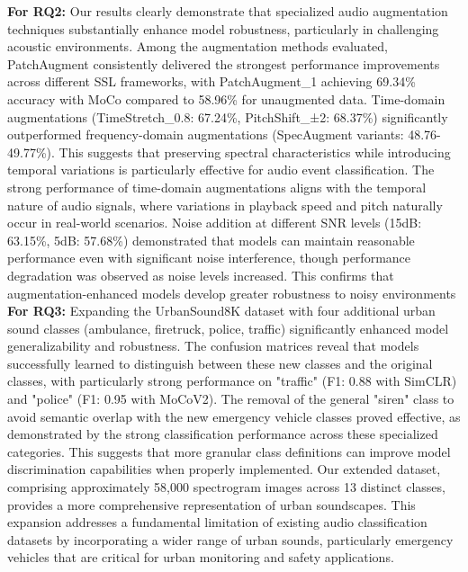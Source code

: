 \documentclass[11pt]{article}
\begin{document}
\textbf{For RQ2:} Our results clearly demonstrate that specialized audio augmentation techniques substantially enhance model robustness, particularly in challenging acoustic environments. Among the augmentation methods evaluated, PatchAugment consistently delivered the strongest performance improvements across different SSL frameworks, with PatchAugment\_1 achieving 69.34\% accuracy with MoCo compared to 58.96\% for unaugmented data. Time-domain augmentations (TimeStretch\_0.8: 67.24\%, PitchShift\_±2: 68.37\%) significantly outperformed frequency-domain augmentations (SpecAugment variants: 48.76-49.77\%). This suggests that preserving spectral characteristics while introducing temporal variations is particularly effective for audio event classification. The strong performance of time-domain augmentations aligns with the temporal nature of audio signals, where variations in playback speed and pitch naturally occur in real-world scenarios. Noise addition at different SNR levels (15dB: 63.15\%, 5dB: 57.68\%) demonstrated that models can maintain reasonable performance even with significant noise interference, though performance degradation was observed as noise levels increased. This confirms that augmentation-enhanced models develop greater robustness to noisy environments
\textbf{For RQ3:} Expanding the UrbanSound8K dataset with four additional urban sound classes (ambulance, firetruck, police, traffic) significantly enhanced model generalizability and robustness. The confusion matrices reveal that models successfully learned to distinguish between these new classes and the original classes, with particularly strong performance on "traffic" (F1: 0.88 with SimCLR) and "police" (F1: 0.95 with MoCoV2). The removal of the general "siren" class to avoid semantic overlap with the new emergency vehicle classes proved effective, as demonstrated by the strong classification performance across these specialized categories. This suggests that more granular class definitions can improve model discrimination capabilities when properly implemented. Our extended dataset, comprising approximately 58,000 spectrogram images across 13 distinct classes, provides a more comprehensive representation of urban soundscapes. This expansion addresses a fundamental limitation of existing audio classification datasets by incorporating a wider range of urban sounds, particularly emergency vehicles that are critical for urban monitoring and safety applications.
\end{document}
